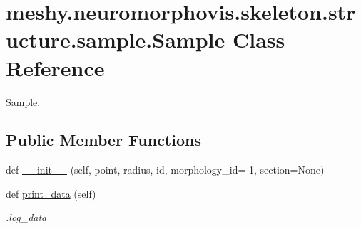 \hypertarget{classmeshy_1_1neuromorphovis_1_1skeleton_1_1structure_1_1sample_1_1Sample}{}\section{meshy.\+neuromorphovis.\+skeleton.\+structure.\+sample.\+Sample Class Reference}
\label{classmeshy_1_1neuromorphovis_1_1skeleton_1_1structure_1_1sample_1_1Sample}


\hyperlink{classmeshy_1_1neuromorphovis_1_1skeleton_1_1structure_1_1sample_1_1Sample}{Sample}.  


\subsection*{Public Member Functions}
\begin{DoxyCompactItemize}
\item 
def \hyperlink{classmeshy_1_1neuromorphovis_1_1skeleton_1_1structure_1_1sample_1_1Sample_ace4185bcfb0625546bbabc4fbd42876e}{\+\_\+\+\_\+init\+\_\+\+\_\+} (self, point, radius, id, morphology\+\_\+id=-\/1, section=None)
\item 
def \hyperlink{classmeshy_1_1neuromorphovis_1_1skeleton_1_1structure_1_1sample_1_1Sample_a94e18a1c0e438a1b390228f87009f49e}{print\+\_\+data} (self)
\begin{DoxyCompactList}\small\item\em .log\+\_\+data \end{DoxyCompactList}\end{DoxyCompactItemize}
